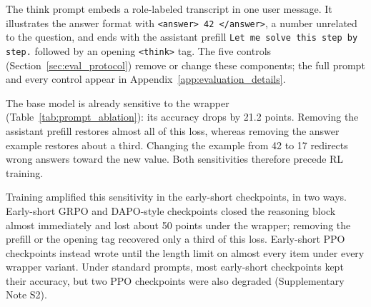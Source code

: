 \documentclass[ai,article,submit,oneauthor]{Definitions/mdpi}
\begin{document}
The think prompt embeds a role-labeled transcript in one user message. It illustrates the answer format with \texttt{<answer> 42 </answer>}, a number unrelated to the question, and ends with the assistant prefill \texttt{Let me solve this step by step.} followed by an opening \texttt{<think>} tag. The five controls (Section~\ref{sec:eval_protocol}) remove or change these components; the full prompt and every control appear in Appendix~\ref{app:evaluation_details}.

\begin{table}[H]
\centering
\small
\setlength{\tabcolsep}{3pt}
\caption{GSM8K flexible accuracy (\%) under the original think prompt and component controls, with standard prompting as the reference condition.}
\label{tab:prompt_ablation}
\end{table}

The base model is already sensitive to the wrapper (Table~\ref{tab:prompt_ablation}): its accuracy drops by 21.2 points. Removing the assistant prefill restores almost all of this loss, whereas removing the answer example restores about a third. Changing the example from 42 to 17 redirects wrong answers toward the new value. Both sensitivities therefore precede RL training.

Training amplified this sensitivity in the early-short checkpoints, in two ways. Early-short GRPO and DAPO-style checkpoints closed the reasoning block almost immediately and lost about 50 points under the wrapper; removing the prefill or the opening tag recovered only a third of this loss. Early-short PPO checkpoints instead wrote until the length limit on almost every item under every wrapper variant. Under standard prompts, most early-short checkpoints kept their accuracy, but two PPO checkpoints were also degraded (Supplementary Note S2).
\end{document}
